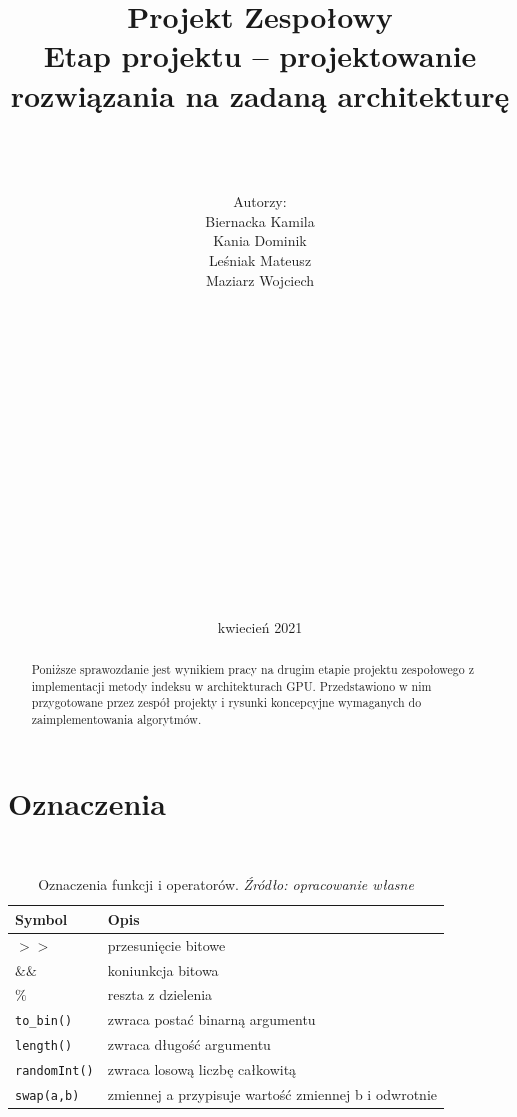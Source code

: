 \documentclass[]{article}
\title{Projekt Zespołowy \\
	\Huge Etap projektu – projektowanie rozwiązania na zadaną architekturę}
\author{\\ \\ \\ Autorzy:
	\\Biernacka Kamila\\ 
	Kania Dominik\\ 
	Leśniak Mateusz\\ 
	Maziarz Wojciech\\ \\ \\ \\ \\ \\ \\ \\ \\ \\ \\ \\ \\ \\ \\ \\ \\  }
\date{kwiecień 2021}
\begin{document}
\maketitle
\newpage



\begin{abstract}
Poniższe sprawozdanie jest wynikiem pracy na drugim etapie projektu zespołowego z implementacji metody indeksu w architekturach GPU. Przedstawiono w nim przygotowane przez zespół projekty i rysunki koncepcyjne wymaganych do zaimplementowania algorytmów.
\end{abstract}

\tableofcontents
\clearpage
\section{Oznaczenia} ~


\begin{longtable}{|p{}|l|}
	\caption{Oznaczenia funkcji i operatorów. \textit{Źródło: opracowanie własne}}
	\label{oznaczenia}
	\\\hline
	\textbf{Symbol}   & 	\textbf{Opis} \\ \hline
	$>>$& przesunięcie bitowe\\ \hline
	$\&\&$     & koniunkcja bitowa\\ \hline
	$\%$  & reszta z dzielenia \\ \hline
	\texttt{to\_bin()}  & zwraca postać binarną argumentu \\ \hline
	\texttt{length()}  & zwraca długość argumentu \\ \hline
	\texttt{randomInt()} & zwraca losową liczbę całkowitą \\ \hline
	\texttt{swap(a,b)} & zmiennej a przypisuje wartość zmiennej b i odwrotnie\\ \hline
	
\end{longtable}
\newpage
\end{document}
